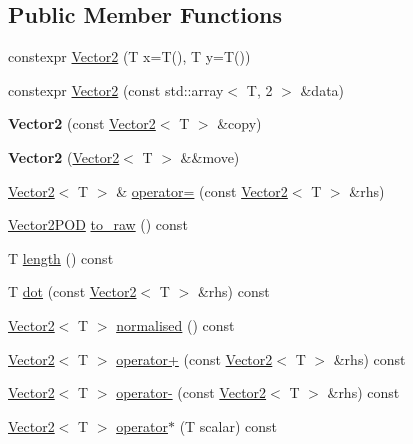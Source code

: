 \subsection*{Public Member Functions}
\begin{DoxyCompactItemize}
\item 
constexpr \mbox{\hyperlink{class_vector2_a555afa6a898aede6b81e3bdf618e23bc}{Vector2}} (T x=T(), T y=T())
\item 
constexpr \mbox{\hyperlink{class_vector2_ae611e87470765c3e8ed27bdc8971d0ce}{Vector2}} (const std\+::array$<$ T, 2 $>$ \&data)
\item 
\mbox{\label{class_vector2_a305608dcc605f038380948d5e7a21bc4}} 
{\bfseries Vector2} (const \mbox{\hyperlink{class_vector2}{Vector2}}$<$ T $>$ \&copy)
\item 
\mbox{\label{class_vector2_a89121e3a573ef8a476733afabf3eca38}} 
{\bfseries Vector2} (\mbox{\hyperlink{class_vector2}{Vector2}}$<$ T $>$ \&\&move)
\item 
\mbox{\hyperlink{class_vector2}{Vector2}}$<$ T $>$ \& \mbox{\hyperlink{class_vector2_ab8633853c2cb5c1d51610654bab61e79}{operator=}} (const \mbox{\hyperlink{class_vector2}{Vector2}}$<$ T $>$ \&rhs)
\item 
\mbox{\hyperlink{struct_vector2_p_o_d}{Vector2\+P\+OD}} \mbox{\hyperlink{class_vector2_ab4c2e1a3fe9216e506e3ab60c02348b2}{to\+\_\+raw}} () const
\item 
T \mbox{\hyperlink{class_vector2_a784391c74b4bd821fc4a6277170c1263}{length}} () const
\item 
T \mbox{\hyperlink{class_vector2_a9f7a1b36270fa93b51546d2b29228e39}{dot}} (const \mbox{\hyperlink{class_vector2}{Vector2}}$<$ T $>$ \&rhs) const
\item 
\mbox{\hyperlink{class_vector2}{Vector2}}$<$ T $>$ \mbox{\hyperlink{class_vector2_aa21618ee0b6e9684da1a5b2d7c8ad3d4}{normalised}} () const
\item 
\mbox{\hyperlink{class_vector2}{Vector2}}$<$ T $>$ \mbox{\hyperlink{class_vector2_af608a3b5bb42148c2260fb0ba9cf0950}{operator+}} (const \mbox{\hyperlink{class_vector2}{Vector2}}$<$ T $>$ \&rhs) const
\item 
\mbox{\hyperlink{class_vector2}{Vector2}}$<$ T $>$ \mbox{\hyperlink{class_vector2_ab79812a53ba6238fdcaef73cb22fcbb3}{operator-\/}} (const \mbox{\hyperlink{class_vector2}{Vector2}}$<$ T $>$ \&rhs) const
\item 
\mbox{\hyperlink{class_vector2}{Vector2}}$<$ T $>$ \mbox{\hyperlink{class_vector2_a6b89b2f334240f06480bc55fce6c2a5a}{operator$\ast$}} (T scalar) const

\end{DoxyCompactItemize}
